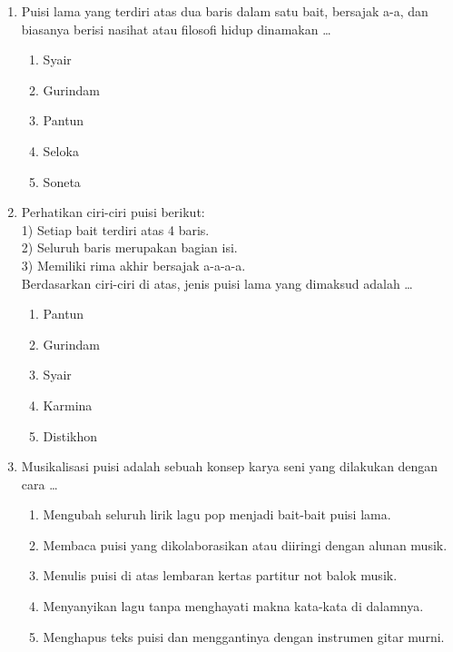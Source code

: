 \documentclass[12pt,a4paper]{article}
\begin{document}
\begin{enumerate}[leftmargin=*]
\item Puisi lama yang terdiri atas dua baris dalam satu bait, bersajak a-a, dan biasanya berisi nasihat atau filosofi hidup dinamakan \dots
    \begin{enumerate}[label=\alph*.]
        \item Syair
        \item Gurindam
        \item Pantun
        \item Seloka
        \item Soneta
    \end{enumerate}

\item Perhatikan ciri-ciri puisi berikut:\\
1) Setiap bait terdiri atas 4 baris.\\
2) Seluruh baris merupakan bagian isi.\\
3) Memiliki rima akhir bersajak a-a-a-a.\\
Berdasarkan ciri-ciri di atas, jenis puisi lama yang dimaksud adalah \dots
    \begin{enumerate}[label=\alph*.]
        \item Pantun
        \item Gurindam
        \item Syair
        \item Karmina
        \item Distikhon
    \end{enumerate}

\item Musikalisasi puisi adalah sebuah konsep karya seni yang dilakukan dengan cara \dots
    \begin{enumerate}[label=\alph*.]
        \item Mengubah seluruh lirik lagu pop menjadi bait-bait puisi lama.
        \item Membaca puisi yang dikolaborasikan atau diiringi dengan alunan musik.
        \item Menulis puisi di atas lembaran kertas partitur not balok musik.
        \item Menyanyikan lagu tanpa menghayati makna kata-kata di dalamnya.
        \item Menghapus teks puisi dan menggantinya dengan instrumen gitar murni.
    \end{enumerate}


\end{enumerate}
\end{document}

